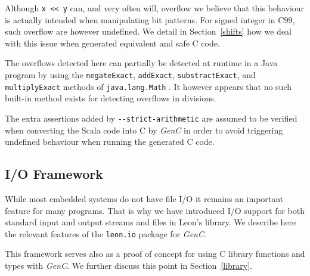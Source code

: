 \documentclass[a4paper,twoside]{article}
\newcommand{\Inline}[1]{\lstinline[basicstyle=\ttfamily]|#1|}
\newcommand{\InlineS}[1]{\lstinline[language=Leon]|#1|}
\newcommand{\GenC}{\emph{GenC}\xspace}
\newcommand{\RefSec}[1]{Section~\ref{#1}}
\begin{document}
Although \InlineS{x << y} can, and very often will, overflow we believe that
this behaviour is actually intended when manipulating bit patterns. For signed
integer in C99, such overflow are however undefined. We detail in
\RefSec{shifts} how we deal with this issue when generated equivalent and safe C
code.

The overflows detected here can partially be detected at runtime in a Java
program by using the \InlineS{negateExact}, \InlineS{addExact},
\InlineS{substractExact}, and \InlineS{multiplyExact} methods of
\InlineS{java.lang.Math} \cite{java8math}. It however appears that no such
built-in method exists for detecting overflows in divisions.

The extra assertions added by \Inline{--strict-arithmetic} are assumed to be
verified when converting the Scala code into C by \GenC in order to avoid
triggering undefined behaviour when running the generated C code.


\subsection{I/O Framework}

While most embedded systems do not have file I/O it remains an important feature
for many programs. That is why we have introduced I/O support for both standard
input and output streams and files in Leon's library. We describe here the
relevant features of the \InlineS{leon.io} package for \GenC.

This framework serves also as a proof of concept for using C library functions
and types with \GenC. We further discuss this point in \RefSec{library}.
\end{document}
